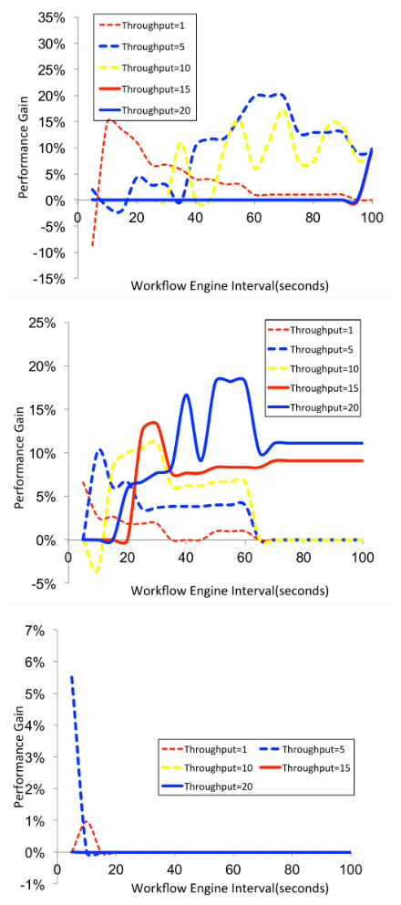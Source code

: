 \begin{figure}[!htb]
\centering
 \includegraphics[width=0.9\linewidth]{figure/DFS-BFS-Broadband.pdf}
  \label{fig:DFS-BFS-Broadband}
\end{figure}

\begin{figure}[!htb]
\centering
 \includegraphics[width=0.9\linewidth]{figure/DFS-BFS-CyberShake.pdf}
  \label{fig:DFS-BFS-CyberShake}
\end{figure}

\begin{figure}[!htb]
\centering
 \includegraphics[width=0.9\linewidth]{figure/DFS-BFS-Montage.pdf}
  \label{fig:DFS-BFS-Montage}
\end{figure}


